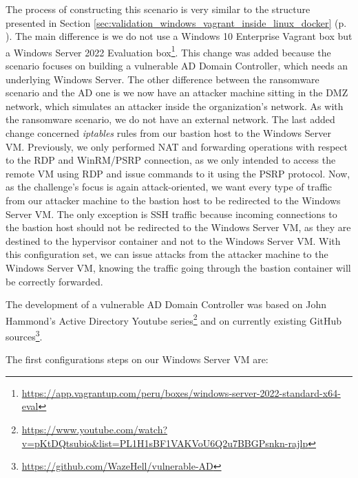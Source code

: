 The process of constructing this scenario is very similar to the structure presented in Section \ref{sec:validation_windows_vagrant_inside_linux_docker} (p. \pageref{sec:validation_windows_vagrant_inside_linux_docker}). The main difference is we do not use a Windows 10 Enterprise Vagrant box but a Windows Server 2022 Evaluation box\footnote{\url{https://app.vagrantup.com/peru/boxes/windows-server-2022-standard-x64-eval}}. This change was added because the scenario focuses on building a vulnerable AD Domain Controller, which needs an underlying Windows Server. The other difference between the ransomware scenario and the AD one is we now have an attacker machine sitting in the DMZ network, which simulates an attacker inside the organization's network. As with the ransomware scenario, we do not have an external network. The last added change concerned \textit{iptables} rules from our bastion host to the Windows Server VM. Previously, we only performed NAT and forwarding operations with respect to the RDP and WinRM/PSRP connection, as we only intended to access the remote VM using RDP and issue commands to it using the PSRP protocol. Now, as the challenge's focus is again attack-oriented, we want every type of traffic from our attacker machine to the bastion host to be redirected to the Windows Server VM. The only exception is SSH traffic because incoming connections to the bastion host should not be redirected to the Windows Server VM, as they are destined to the hypervisor container and not to the Windows Server VM. With this configuration set, we can issue attacks from the attacker machine to the Windows Server VM, knowing the traffic going through the bastion container will be correctly forwarded.

The development of a vulnerable AD Domain Controller was based on John Hammond's Active Directory Youtube series\footnote{\url{https://www.youtube.com/watch?v=pKtDQtsubio&list=PL1H1sBF1VAKVoU6Q2u7BBGPsnkn-rajlp}} and on currently existing GitHub sources\footnote{\url{https://github.com/WazeHell/vulnerable-AD}}.


The first configurations steps on our Windows Server VM are:

